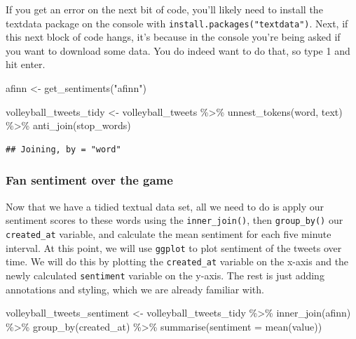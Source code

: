 \documentclass[
]{book}
\newenvironment{Shaded}{\begin{snugshade}}{\end{snugshade}}
\newcommand{\AttributeTok}[1]{\textcolor[rgb]{0.77,0.63,0.00}{#1}}
\newcommand{\FunctionTok}[1]{\textcolor[rgb]{0.00,0.00,0.00}{#1}}
\newcommand{\NormalTok}[1]{#1}
\newcommand{\OtherTok}[1]{\textcolor[rgb]{0.56,0.35,0.01}{#1}}
\newcommand{\SpecialCharTok}[1]{\textcolor[rgb]{0.00,0.00,0.00}{#1}}
\newcommand{\StringTok}[1]{\textcolor[rgb]{0.31,0.60,0.02}{#1}}
\begin{document}
If you get an error on the next bit of code, you'll likely need to install the textdata package on the console with \texttt{install.packages("textdata")}. Next, if this next block of code hangs, it's because in the console you're being asked if you want to download some data. You do indeed want to do that, so type 1 and hit enter.

\begin{Shaded}
\begin{Highlighting}[]
\NormalTok{afinn }\OtherTok{\textless{}{-}} \FunctionTok{get\_sentiments}\NormalTok{(}\StringTok{"afinn"}\NormalTok{)}

\NormalTok{volleyball\_tweets\_tidy }\OtherTok{\textless{}{-}}\NormalTok{ volleyball\_tweets }\SpecialCharTok{\%\textgreater{}\%} 
  \FunctionTok{unnest\_tokens}\NormalTok{(word, text) }\SpecialCharTok{\%\textgreater{}\%} 
  \FunctionTok{anti\_join}\NormalTok{(stop\_words) }
\end{Highlighting}
\end{Shaded}

\begin{verbatim}
## Joining, by = "word"
\end{verbatim}

\hypertarget{fan-sentiment-over-the-game}{%
\subsubsection{Fan sentiment over the game}\label{fan-sentiment-over-the-game}}

Now that we have a tidied textual data set, all we need to do is apply our sentiment scores to these words using the \texttt{inner\_join()}, then \texttt{group\_by()} our \texttt{created\_at} variable, and calculate the mean sentiment for each five minute interval. At this point, we will use \texttt{ggplot} to plot sentiment of the tweets over time. We will do this by plotting the \texttt{created\_at} variable on the x-axis and the newly calculated \texttt{sentiment} variable on the y-axis. The rest is just adding annotations and styling, which we are already familiar with.

\begin{Shaded}
\begin{Highlighting}[]
\NormalTok{volleyball\_tweets\_sentiment }\OtherTok{\textless{}{-}}\NormalTok{ volleyball\_tweets\_tidy }\SpecialCharTok{\%\textgreater{}\%}
  \FunctionTok{inner\_join}\NormalTok{(afinn) }\SpecialCharTok{\%\textgreater{}\%} 
  \FunctionTok{group\_by}\NormalTok{(created\_at) }\SpecialCharTok{\%\textgreater{}\%} 
  \FunctionTok{summarise}\NormalTok{(}\AttributeTok{sentiment =} \FunctionTok{mean}\NormalTok{(value))}
\end{Highlighting}
\end{Shaded}
\end{document}
